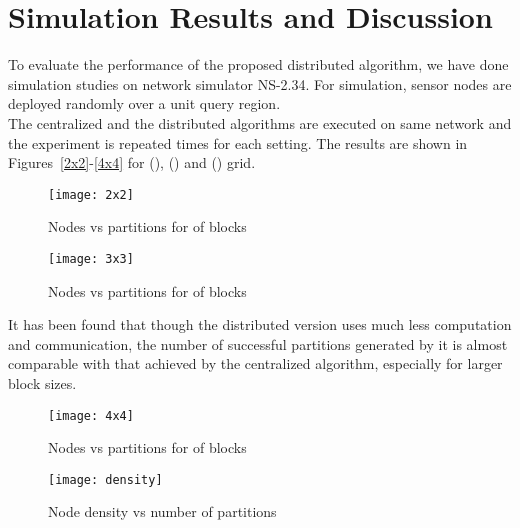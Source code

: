 \documentclass{acm_proc_article-sp}
\begin{document}
\section{Simulation Results and Discussion}
\label{sec_4}
To evaluate the performance of the proposed distributed algorithm, we have done simulation studies on network simulator NS-2.34. For simulation,  sensor nodes are deployed randomly over a  unit query region.\\
The centralized and the distributed algorithms are executed on same network and the experiment is repeated  times for each setting. The results are shown in Figures~\ref{2x2}-\ref{4x4} for (), () and () grid. 
\begin{figure}[ht]
		\begin{minipage}[b]{0.49\linewidth}
		  \centering
		  \texttt{[image: 2x2]}
		  \caption{\scriptsize{Nodes vs partitions for  of blocks}}
		   \label{2x2}
	      \end{minipage}
 	      \hspace{0.1cm}
	      \begin{minipage}[b]{0.49\linewidth}
		  \centering
		  \texttt{[image: 3x3]}
		  \caption{\scriptsize{Nodes vs partitions for  of blocks}}
		   \label{3x3}
	      \end{minipage}
\end{figure}
It has been found that though the distributed version uses much less computation and communication, the number of successful partitions generated by it is almost comparable with that achieved by the centralized algorithm, especially for larger block sizes. 
 \begin{figure}[ht!]
		\begin{minipage}[b]{0.40\linewidth}
		  \centering
		  \texttt{[image: 4x4]}
		  \caption{\scriptsize{Nodes vs partitions for  of blocks}}
		   \label{4x4}
	      \end{minipage}
  	      \hspace{0.82cm}
	      \begin{minipage}[b]{0.40\linewidth}
		  \centering
\texttt{[image: density]}
	    		  \caption{\scriptsize{Node density vs number of partitions}}
		 \label{fig_densityvspartition}
		\end{minipage}
\end{figure}
\end{document}
